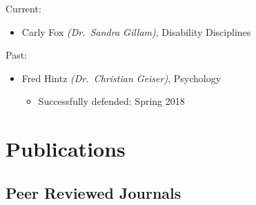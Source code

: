 \documentclass[11pt,a4paper,]{moderncv}
\providecommand{\tightlist}{%
	\setlength{\itemsep}{0pt}\setlength{\parskip}{0pt}}
\begin{document}
Current:

\begin{itemize}
\tightlist
\item
  Carly Fox \emph{(Dr.~Sandra Gillam)}, Disability Disciplines
\end{itemize}

Past:

\begin{itemize}
\tightlist
\item
  Fred Hintz \emph{(Dr.~Christian Geiser)}, Psychology

  \begin{itemize}
  \tightlist
  \item
    Successfully defended: Spring 2018
  \end{itemize}
\end{itemize}

\clearpage

\hypertarget{publications}{%
\section{Publications}\label{publications}}

\hypertarget{peer-reviewed-journals}{%
\subsection{Peer Reviewed Journals}\label{peer-reviewed-journals}}
\end{document}
